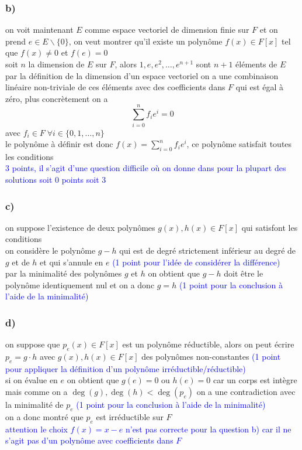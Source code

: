 \documentclass[11pt, a4paper, oneside]{article}
\begin{document}
\subsubsection*{b)}
on voit maintenant $E$ comme espace vectoriel de dimension finie sur $F$ et on prend $e\in E \backslash \{0\}$, on veut montrer qu'il existe un polynôme $f(x) \in F[x]$ tel que $f(x) \neq 0$ et $f(e)=0$ \\
soit $n$ la dimension de $E$ sur $F$, alors $1,e,e^2,\ldots,e^{n+1}$ sont $n+1$ éléments de $E$ \\
{\tiny par la définition de la dimension d'un espace vectoriel} on a une combinaison linéaire non-triviale de ces éléments avec des coefficients dans $F$ qui est égal à zéro, plus concrètement on a
$$\sum_{i=0}^n f_ie^i = 0$$
avec $f_i \in F \; \forall i\in \{0,1,\ldots,n\}$ \\
le polynôme à définir est donc $f(x) = \sum_{i=0}^n f_ie^i$, {\tiny ce polynôme satisfait toutes les conditions} \\ 
\textcolor{blue}{3 points, il s'agit d'une question difficile où on donne dans pour la plupart des solutions soit 0 points soit 3}

\subsubsection*{c)}
on suppose l'existence de deux polynômes $g(x),h(x) \in F[x]$ qui satisfont les conditions \\
on considère le polynôme $g-h$ qui est de degré strictement inférieur au degré de $g$ et de $h$ et qui s'annule en $e$ \textcolor{blue}{(1 point pour l'idée de considérer la différence)} \\
par la minimalité des polynômes $g$ et $h$ on obtient que $g-h$ doit être le polynôme identiquement nul et on a donc $g=h$ \textcolor{blue}{(1 point pour la conclusion à l'aide de la minimalité)}

\subsubsection*{d)}
on suppose que $p_e(x)\in F[x]$ est un polynôme réductible, alors on peut écrire $p_e=g\cdot h$ avec $g(x),h(x) \in F[x]$ des polynômes non-constantes \textcolor{blue}{(1 point pour appliquer la définition d'un polynôme irréductible/réductible)} \\
si on évalue en $e$ on obtient que $g(e) = 0$ ou $h(e) = 0$ {\tiny car un corps est intègre} \\
mais comme on a $\deg(g),\deg(h) < \deg(p_e)$ on a une contradiction avec la minimalité de $p_e$ \textcolor{blue}{(1 point pour la conclusion à l'aide de la minimalité)} \\
{\tiny on a donc montré que $p_e$ est irréductible sur $F$} \\
\textcolor{blue}{attention le choix $f(x)=x-e$ n'est pas correcte pour la question b) car il ne s'agit pas d'un polynôme avec coefficients dans $F$}
\end{document}
